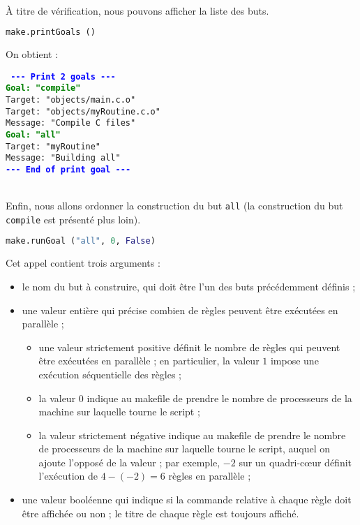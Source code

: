 \documentclass[a4paper,12pt,obeyspaces,openany]{extarticle}
\begin{document}
~\\À titre de vérification, nous pouvons afficher la liste des buts.
\begin{lstlisting}[language=py]
make.printGoals ()
\end{lstlisting}

On obtient :

\noindent\texttt{\footnotesize
\textcolor{blue}{\bf{-}{-}{-} Print 2 goals {-}{-}{-}}\\
\textcolor{green}{\bf Goal: "compile"}\\
\hspace*{1.2em}Target: "objects/main.c.o"\\
\hspace*{1.2em}Target: "objects/myRoutine.c.o"\\
\hspace*{1.2em}Message: "Compile C files"\\
\textcolor{green}{\bf Goal: "all"}\\
\hspace*{1.2em}Target: "myRoutine"\\
\hspace*{1.2em}Message: "Building all"\\
\textcolor{blue}{\bf{-}{-}{-} End of print goal {-}{-}{-}}
}

~\\Enfin, nous allons ordonner la construction du but \texttt{all} (la construction du but \texttt{compile} est présenté plus loin).
\begin{lstlisting}[language=py]
make.runGoal ("all", 0, False)
\end{lstlisting}
Cet appel contient trois arguments :
\begin{itemize}
\item le nom du but à construire, qui doit être l'un des buts précédemment définis ;
\item une valeur entière qui précise combien de règles peuvent être exécutées en parallèle ;
  \begin{itemize}
  \item une valeur strictement positive définit le nombre de règles qui peuvent être exécutées en parallèle ; en particulier, la valeur $1$ impose une exécution séquentielle des règles ;
  \item la valeur $0$ indique au makefile de prendre le nombre de processeurs de la machine sur laquelle tourne le script ;
  \item la valeur strictement négative indique au makefile de prendre le nombre de processeurs de la machine sur laquelle tourne le script, auquel on ajoute l'opposé de la valeur ; par exemple, $-2$ sur un quadri-cœur définit l'exécution de $4-(-2)=6$ règles en parallèle ;
  \end{itemize}
\item une valeur booléenne qui indique si la commande relative à chaque règle doit être affichée ou non ; le titre de chaque règle est toujours affiché.
\end{itemize}
\end{document}
